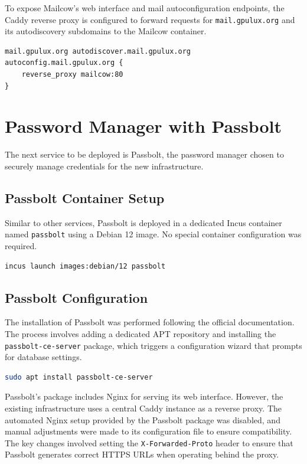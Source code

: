 To expose Mailcow's web interface and mail autoconfiguration endpoints, the Caddy reverse proxy is configured to forward requests for \texttt{mail.gpulux.org} and its autodiscovery subdomains to the Mailcow container.

\begin{lstlisting}[caption={Caddyfile configuration to reverse proxy Mailcow.}]
mail.gpulux.org autodiscover.mail.gpulux.org autoconfig.mail.gpulux.org {
    reverse_proxy mailcow:80
}
\end{lstlisting}

\section{Password Manager with Passbolt}

The next service to be deployed is Passbolt, the password manager chosen to securely manage credentials for the new infrastructure.

\subsection*{Passbolt Container Setup}

Similar to other services, Passbolt is deployed in a dedicated Incus container named \texttt{passbolt} using a Debian 12 image. No special container configuration was required.

\begin{lstlisting}[language=bash,caption={Creating the Passbolt container.}]
incus launch images:debian/12 passbolt
\end{lstlisting}

\subsection*{Passbolt Configuration}

The installation of Passbolt was performed following the official documentation\cite{passbolt-install-debian}. The process involves adding a dedicated APT repository and installing the \texttt{passbolt-ce-server} package, which triggers a configuration wizard that prompts for database settings.

\begin{lstlisting}[language=bash,caption={Installing Passbolt CE server package.}]
sudo apt install passbolt-ce-server
\end{lstlisting}

Passbolt's package includes Nginx for serving its web interface. However, the existing infrastructure uses a central Caddy instance as a reverse proxy. The automated Nginx setup provided by the Passbolt package was disabled, and manual adjustments were made to its configuration file to ensure compatibility. The key changes involved setting the \texttt{X-Forwarded-Proto} header to ensure that Passbolt generates correct HTTPS URLs when operating behind the proxy.

